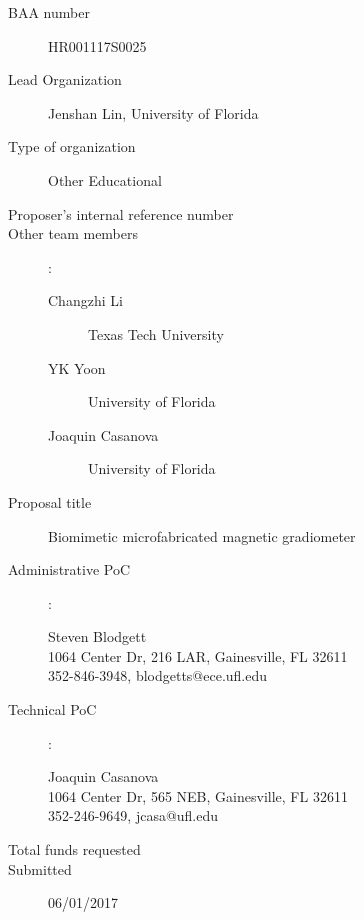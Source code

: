 
\begin{description}
\item [BAA number] HR001117S0025
\item [Lead Organization] Jenshan Lin, University of Florida
\item [Type of organization] Other Educational
\item [Proposer’s internal reference number]
\item [Other team members]:
  \begin{description}
  \item [Changzhi Li] Texas Tech University
  \item [YK Yoon] University of Florida 
  \item [Joaquin Casanova] University of Florida 
  \end{description}
\item [Proposal title] Biomimetic microfabricated magnetic gradiometer
\item [Administrative PoC]:
  \begin{description}
  \item [Steven Blodgett]
  \item [1064 Center Dr, 216 LAR, Gainesville, FL 32611]
  \item [352-846-3948, blodgetts@ece.ufl.edu]
  \end{description}
\item [Technical PoC]:
  \begin{description}
  \item [Joaquin Casanova]
  \item [1064 Center Dr, 565 NEB, Gainesville, FL 32611]
  \item [352-246-9649, jcasa@ufl.edu]
  \end{description}
\item [Total funds requested]
\item [Submitted] 06/01/2017
\end{description}
